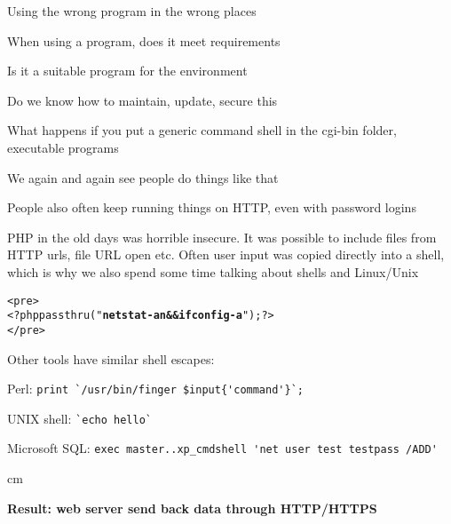 \documentclass[Screen16to9,17pt]{foils}
\begin{document}

\begin{list1}
\item Using the wrong program in the wrong places
\begin{list2}
\item When using a program, does it meet requirements
\item Is it a suitable program for the environment
\item Do we know how to maintain, update, secure this
\end{list2}
\item What happens if you put a generic command shell in the cgi-bin folder, executable programs
\item We again and again see people do things like that
\item People also often keep running things on HTTP, even with password logins
\end{list1}


\begin{list1}
\item PHP in the old days was horrible insecure. It was possible to include files from HTTP urls, file URL open etc. Often user input was copied directly into a shell, which is why we also spend some time talking about shells and Linux/Unix
\end{list1}
\begin{alltt}
<pre>
<?php passthru("{\bf netstat -an && ifconfig -a}"); ?>
</pre>
\end{alltt}
\begin{list1}
\item Other tools have similar shell escapes:
\begin{list2}
\item Perl: \verb+print `/usr/bin/finger $input{'command'}`;+
\item UNIX shell: \verb+`echo hello`+
\item Microsoft SQL: \verb+exec master..xp_cmdshell 'net user test testpass /ADD'+
\end{list2}
\end{list1}

 cm

\centerline{\bf Result: web server send back data through HTTP/HTTPS}


\end{document}
